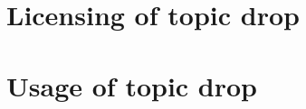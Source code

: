 \documentclass[output=book,
		  ]{langscibook}
\begin{document}

\maketitle
\frontmatter
{} %
{\sloppy\tableofcontents}
%

%  
\mainmatter



\part{Licensing of topic drop}

\part{Usage of topic drop}


% 
\sloppy

\end{document}
